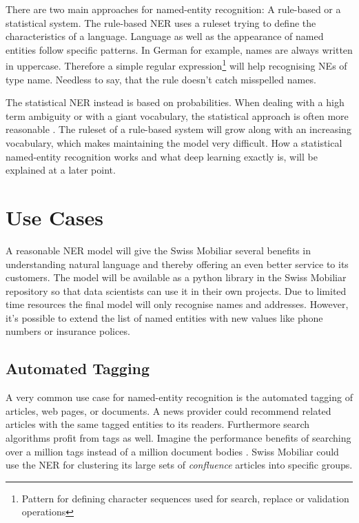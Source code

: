There are two main approaches for named-entity recognition: A rule-based or a statistical system. The rule-based NER uses a ruleset trying to define the characteristics of a language. Language as well as the appearance of named entities follow specific patterns. In German for example, names are always written in uppercase. Therefore a simple regular expression\footnote{Pattern for defining character sequences used for search, replace or validation operations} will help recognising NEs of type name. Needless to say, that the rule doesn't catch misspelled names.

The statistical NER instead is based on probabilities. When dealing with a high term ambiguity or with a giant vocabulary, the statistical approach is often more reasonable \cite{blub}. The ruleset of a rule-based system will grow along with an increasing vocabulary, which makes maintaining the model very difficult. How a statistical named-entity recognition works and what deep learning exactly is, will be explained at a later point.

\section{Use Cases}
\label{chap:use-cases}

A reasonable NER model will give the Swiss Mobiliar several benefits in understanding natural language and thereby offering an even better service to its customers. The model will be available as a python library in the Swiss Mobiliar repository so that data scientists can use it in their own projects. Due to limited time resources the final model will only recognise names and addresses. However, it's possible to extend the list of named entities with new values like phone numbers or insurance polices.

\subsection{Automated Tagging}

A very common use case for named-entity recognition is the automated tagging of articles, web pages, or documents. A news provider could recommend related articles with the same tagged entities to its readers. Furthermore search algorithms profit from tags as well. Imagine the performance benefits of searching over a million tags instead of a million document bodies \cite{gupta}. Swiss Mobiliar could use the NER for clustering its large sets of \emph{confluence} articles into specific groups.

